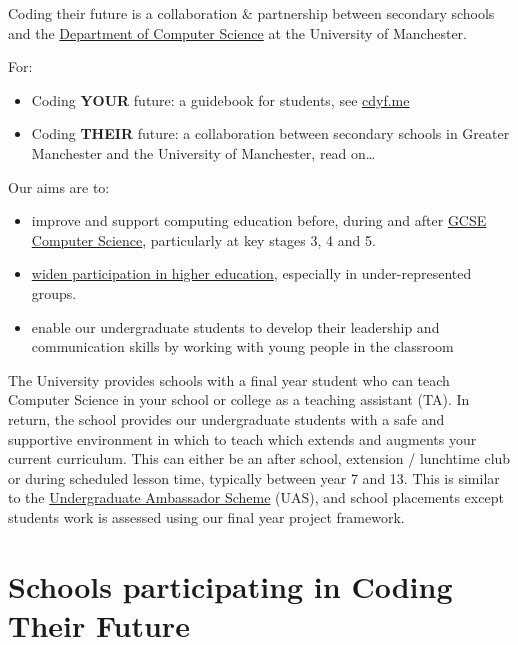 \documentclass[
  12pt,
]{book}
\providecommand{\tightlist}{%
  \setlength{\itemsep}{0pt}\setlength{\parskip}{0pt}}
\begin{document}
Coding their future is a collaboration \& partnership between secondary schools and the \href{https://www.cs.manchester.ac.uk/}{Department of Computer Science} at the University of Manchester.

For:

\begin{itemize}
\tightlist
\item
  Coding \textbf{YOUR} future: a guidebook for students, see \href{https://www.cdyf.me/}{cdyf.me}
\item
  Coding \textbf{THEIR} future: a collaboration between secondary schools in Greater Manchester and the University of Manchester, read on\ldots{}
\end{itemize}

Our aims are to:

\begin{itemize}
\tightlist
\item
  improve and support computing education before, during and after \href{https://www.bbc.co.uk/bitesize/subjects/z34k7ty}{GCSE Computer Science}, particularly at key stages 3, 4 and 5. \citep{shutdownrestart, afterthereboot, cse, cambridgegcse}
\item
  \href{https://www.manchester.ac.uk/discover/social-responsibility/widening-participation/}{widen participation in higher education}, especially in under-represented groups. \citep{assir, classceiling, nicebutdim, breakintoelite}
\item
  enable our undergraduate students to develop their leadership and communication skills by working with young people in the classroom
\end{itemize}

The University provides schools with a final year student who can teach Computer Science in your school or college as a teaching assistant (TA). In return, the school provides our undergraduate students with a safe and supportive environment in which to teach which extends and augments your current curriculum. This can either be an after school, extension / lunchtime club or during scheduled lesson time, typically between year 7 and 13. This is similar to the \href{https://en.wikipedia.org/wiki/Undergraduate_Ambassadors_Scheme}{Undergraduate Ambassador Scheme} (UAS), \citep{uas, Cooper2005} and school placements \citep{Moller2019} except students work is assessed using our final year project framework. \citep{COMP30030, COMP30040}

\hypertarget{schools}{%
\section{Schools participating in Coding Their Future}\label{schools}}
\end{document}
